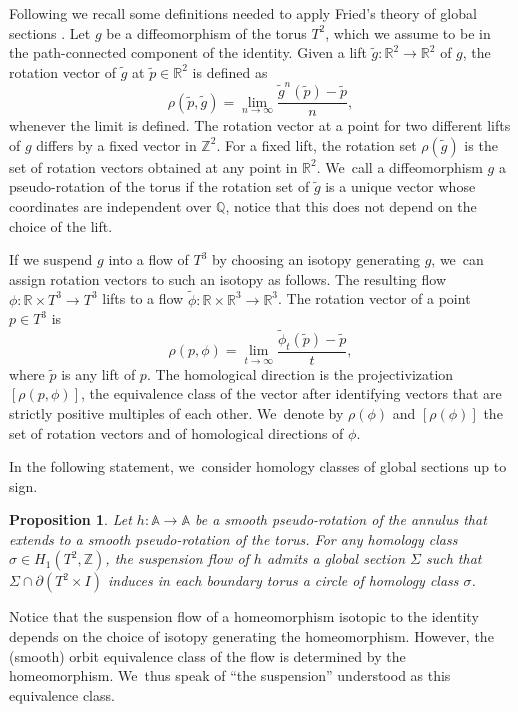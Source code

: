 \documentclass[JEP,XML,SOM,Unicode,NoEqCountersInSection,NoFloatCountersInSection,published]{cedram}
\newtheorem{prop}[theorem]{Proposition}
\theoremstyle{definition}
\begin{document}
Following \cite{K1} we recall some definitions needed to apply Fried's theory of global sections \cite{Fr}. Let $g$ be a diffeomorphism of the torus $T^2$, which we assume to be in the path-connected component of the identity. Given a lift $\widetilde g:\mathbb{R}^2 \rightarrow \mathbb{R}^2$ of $g$, the rotation vector of $\widetilde g$ at $\widetilde p \in \mathbb{R}^2$ is defined as
\[
\rho(\widetilde p, \widetilde g)=\lim_{n\rightarrow \infty} \frac{\widetilde g^n(\widetilde p)-\widetilde p}{n},
\]
whenever the limit is defined. The rotation vector at a point for two different lifts of $g$ differs by a fixed vector in $\mathbb{Z}^2$. For a fixed lift, the rotation set $\rho(\widetilde g)$ is the set of rotation vectors obtained at any point in $\mathbb{R}^2$. We~call a diffeomorphism $g$ a pseudo-rotation of the torus if the rotation set of $\widetilde g$ is a unique vector whose coordinates are independent over $\mathbb{Q}$, notice that this does not depend on the choice of the lift.

If we suspend $g$ into a flow of $T^3$ by choosing an isotopy generating $g$, we~can assign rotation vectors to such an isotopy as follows. The resulting flow $\phi: \mathbb{R}\times T^3\rightarrow T^3$ lifts to a flow $\widetilde \phi: \mathbb{R}\times \mathbb{R}^3\rightarrow \mathbb{R}^3$. The rotation vector of a point $p\in T^3$ is
\[
\rho(p,\phi)=\lim_{t\rightarrow \infty}\frac{\widetilde \phi_t(\widetilde p)-\widetilde p}{t},
\]
where $\widetilde p$ is any lift of $p$. The homological direction is the projectivization $[\rho(p,\phi)]$, \ie the equivalence class of the vector after identifying vectors that are strictly positive multiples of each other. We~denote by $\rho(\phi)$ and $[\rho(\phi)]$ the set of rotation vectors and of homological directions of $\phi$.

In the following statement, we~consider homology classes of global sections up to sign.
\begin{prop}\label{prop:sections}
Let $h: \mathbb{A} \rightarrow \mathbb{A}$ be a smooth pseudo-rotation of the annulus that extends to a smooth pseudo-rotation of the torus. For any homology class $\sigma\in H_1(T^2,\mathbb{Z})$, the suspension flow of $h$ admits a global section $\Sigma$ such that $ \Sigma \cap \partial (T^2\times I)$ induces in each boundary torus a circle of homology class $\sigma$.
\end{prop}

Notice that the suspension flow of a homeomorphism isotopic to the identity depends on the choice of isotopy generating the homeomorphism. However, the (smooth) orbit equivalence class of the flow is determined by the homeomorphism. We~thus speak of ``the suspension'' understood as this equivalence class.
\end{document}
